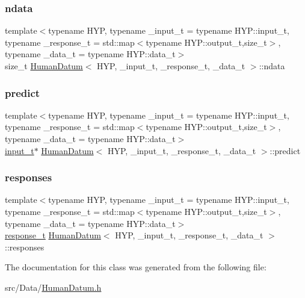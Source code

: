 \mbox{\label{struct_human_datum_a4cabbec51db8dae4e680be03e135a22a}} 
\subsubsection{\texorpdfstring{ndata}{ndata}}
{\footnotesize\ttfamily template$<$typename H\+YP, typename \+\_\+input\+\_\+t = typename H\+Y\+P\+::input\+\_\+t, typename \+\_\+response\+\_\+t = std\+::map$<$typename H\+Y\+P\+::output\+\_\+t,size\+\_\+t$>$, typename \+\_\+data\+\_\+t = typename H\+Y\+P\+::data\+\_\+t$>$ \\
size\+\_\+t \hyperlink{struct_human_datum}{Human\+Datum}$<$ H\+YP, \+\_\+input\+\_\+t, \+\_\+response\+\_\+t, \+\_\+data\+\_\+t $>$\+::ndata}

\mbox{\label{struct_human_datum_a181f72457631b0923c54993defe55226}} 
\subsubsection{\texorpdfstring{predict}{predict}}
{\footnotesize\ttfamily template$<$typename H\+YP, typename \+\_\+input\+\_\+t = typename H\+Y\+P\+::input\+\_\+t, typename \+\_\+response\+\_\+t = std\+::map$<$typename H\+Y\+P\+::output\+\_\+t,size\+\_\+t$>$, typename \+\_\+data\+\_\+t = typename H\+Y\+P\+::data\+\_\+t$>$ \\
\hyperlink{struct_human_datum_a8229662f54f4b18d33b0d068d23b03b0}{input\+\_\+t}$\ast$ \hyperlink{struct_human_datum}{Human\+Datum}$<$ H\+YP, \+\_\+input\+\_\+t, \+\_\+response\+\_\+t, \+\_\+data\+\_\+t $>$\+::predict}

\mbox{\label{struct_human_datum_aac9863d06981207645ce7acf1bb7c8c9}} 
\subsubsection{\texorpdfstring{responses}{responses}}
{\footnotesize\ttfamily template$<$typename H\+YP, typename \+\_\+input\+\_\+t = typename H\+Y\+P\+::input\+\_\+t, typename \+\_\+response\+\_\+t = std\+::map$<$typename H\+Y\+P\+::output\+\_\+t,size\+\_\+t$>$, typename \+\_\+data\+\_\+t = typename H\+Y\+P\+::data\+\_\+t$>$ \\
\hyperlink{struct_human_datum_a372a0b9a919bc58aae2fa4de57dd9221}{response\+\_\+t} \hyperlink{struct_human_datum}{Human\+Datum}$<$ H\+YP, \+\_\+input\+\_\+t, \+\_\+response\+\_\+t, \+\_\+data\+\_\+t $>$\+::responses}



The documentation for this class was generated from the following file\+:\begin{DoxyCompactItemize}
\item 
src/\+Data/\hyperlink{_human_datum_8h}{Human\+Datum.\+h}\end{DoxyCompactItemize}
